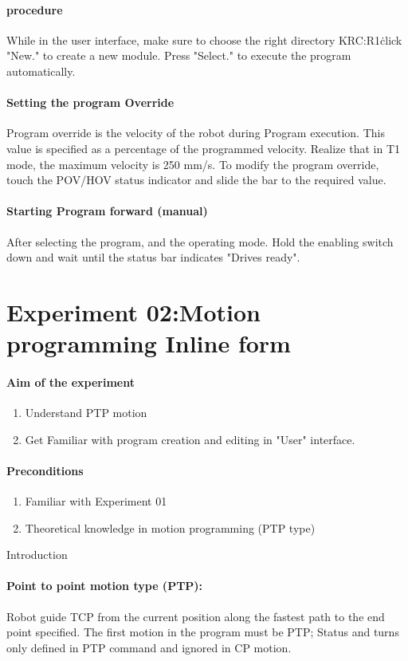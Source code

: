 \paragraph{procedure}
While in the user interface, make sure to choose the right directory KRC:R1\.click "New." to create a new module. 
Press "Select." to execute the program automatically.

\paragraph{Setting the program Override}
Program override is the velocity of the robot during Program execution. This value is specified as a percentage of the programmed velocity. Realize that in T1 mode, the maximum velocity is 250 mm/s. To modify the program override, touch the POV/HOV status indicator and slide the bar to the required value.
\paragraph{Starting Program forward (manual)}
After selecting the program, and the operating mode. Hold the enabling switch down and wait until the status bar indicates "Drives ready".
\section{Experiment 02:Motion programming Inline form}
\paragraph{Aim of the experiment}
\begin{enumerate}
	\item Understand PTP motion
	\item Get Familiar with program creation and editing in "User" interface.
\end{enumerate}
\paragraph{Preconditions}
\begin{enumerate}
	\item Familiar with Experiment 01
	\item Theoretical knowledge in motion programming (PTP type) 
\end{enumerate}
Introduction
\paragraph{Point to point motion type (PTP):}
Robot guide TCP from the current position along the fastest path to the end point specified. 
The first motion in the program must be PTP; Status and turns only defined in PTP command and ignored in CP motion.
